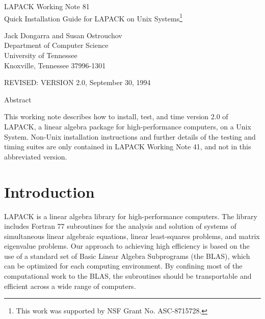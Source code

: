 \begin{center}
  {\Large LAPACK Working Note 81\\
  Quick Installation Guide for LAPACK on Unix Systems\footnote{This work was
 supported by NSF Grant No. ASC-8715728.}}
\end{center}
\begin{center}
  Jack Dongarra and Susan Ostrouchov\\
  Department of Computer Science \\
  University of Tennessee \\
  Knoxville, Tennessee  37996-1301 \\
\end{center}
\begin{center}
  REVISED:  VERSION 2.0, September 30, 1994
\end{center}

\begin{center}
Abstract
\end{center}
This working note describes how to install, test, and time version 2.0
of LAPACK, a linear algebra package for high-performance
computers, on a Unix System.  Non-Unix installation instructions and
further details of the testing and timing suites are only contained in
LAPACK Working Note 41, and not in this abbreviated version.
\newpage

\tableofcontents

\newpage

\section{Introduction}

\dent
LAPACK is a linear algebra library for high-performance
computers.
The library includes Fortran 77 subroutines for 
the analysis and solution of systems of simultaneous linear algebraic
equations, linear least-squares problems, and matrix eigenvalue
problems.
Our approach to achieving high efficiency is based on the use of
a standard set of Basic Linear Algebra Subprograms (the BLAS),
which can be optimized for each computing environment.
By confining most of the computational work to the BLAS,
the subroutines should be 
transportable and efficient across a wide range of computers.

